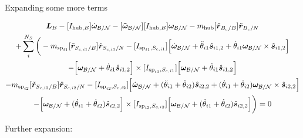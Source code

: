 \documentclass[paper]{aiaaNew}
\begin{document}
Expanding some more terms

\begin{multline}
\bm L_B -[I_{\text{hub},B}] \dot{\bm\omega}_{\cal B/N}  -[\bm{\tilde{\omega}}_{\cal B/N}] [I_{\text{hub},B}] \bm\omega_{\cal B/N} - m_{\text{hub}} [\tilde{{\bm r}}_{B_c/B}] \ddot{\bm r}_{B_c/N} \\
+ \sum\limits_{i}^{N_S}\bigg(- m_{\text{sp}_{i1}} [\tilde{{\bm r}}_{S_{c,i1}/B}] \ddot{\bm r}_{S_{c,i1}/N} -[I_{\text{sp}_{i1},S_{c,i1}}] \Big[\dot{\bm \omega}_{\cal{B/N}} + \ddot{\theta}_{i1} \hat{\bm s}_{i1,2} + \dot{\theta}_{i1} \bm \omega_{\cal{B/N}} \times \hat{\bm s}_{i1,2}\Big]  \\
-\Big[\bm \omega_{\cal{B/N}} + \dot{\theta}_{i1} \hat{\bm s}_{i1,2}\Big] \times [I_{\text{sp}_{i1},S_{c,i1}}] \Big[\bm \omega_{\cal{B/N}} + \dot{\theta}_{i1} \hat{\bm s}_{i1,2}\Big]\\
- m_{\text{sp}_{i2}} [\tilde{{\bm r}}_{S_{c,i2}/B}] \ddot{\bm r}_{S_{c,i2}/N} -[I_{\text{sp}_{i2},S_{c,i2}}] \Big[\dot{\bm \omega}_{\cal{B/N}} + (\ddot{\theta}_{i1}  + \ddot{\theta}_{i2})\hat{\bm s}_{i2,2} + (\dot{\theta}_{i1}  + \dot{\theta}_{i2}) \bm \omega_{\cal{B/N}} \times \hat{\bm s}_{i2,2}\Big]  \\
-\Big[\bm \omega_{\cal{B/N}} + (\dot{\theta}_{i1}  + \dot{\theta}_{i2})\hat{\bm s}_{i2,2}\Big] \times [I_{\text{sp}_{i2},S_{c,i2}}] \Big[\bm \omega_{\cal{B/N}} + (\dot{\theta}_{i1}  + \dot{\theta}_{i2})\hat{\bm s}_{i2,2}\Big]\bigg) = 0
\end{multline}

Further expansion:
\end{document}
